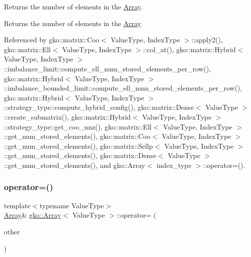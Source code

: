 Returns the number of elements in the \hyperlink{classgko_1_1Array}{Array}. 

\begin{DoxyReturn}{Returns}
the number of elements in the \hyperlink{classgko_1_1Array}{Array} 
\end{DoxyReturn}


Referenced by gko\+::matrix\+::\+Coo$<$ Value\+Type, Index\+Type $>$\+::apply2(), gko\+::matrix\+::\+Ell$<$ Value\+Type, Index\+Type $>$\+::col\+\_\+at(), gko\+::matrix\+::\+Hybrid$<$ Value\+Type, Index\+Type $>$\+::imbalance\+\_\+limit\+::compute\+\_\+ell\+\_\+num\+\_\+stored\+\_\+elements\+\_\+per\+\_\+row(), gko\+::matrix\+::\+Hybrid$<$ Value\+Type, Index\+Type $>$\+::imbalance\+\_\+bounded\+\_\+limit\+::compute\+\_\+ell\+\_\+num\+\_\+stored\+\_\+elements\+\_\+per\+\_\+row(), gko\+::matrix\+::\+Hybrid$<$ Value\+Type, Index\+Type $>$\+::strategy\+\_\+type\+::compute\+\_\+hybrid\+\_\+config(), gko\+::matrix\+::\+Dense$<$ Value\+Type $>$\+::create\+\_\+submatrix(), gko\+::matrix\+::\+Hybrid$<$ Value\+Type, Index\+Type $>$\+::strategy\+\_\+type\+::get\+\_\+coo\+\_\+nnz(), gko\+::matrix\+::\+Ell$<$ Value\+Type, Index\+Type $>$\+::get\+\_\+num\+\_\+stored\+\_\+elements(), gko\+::matrix\+::\+Coo$<$ Value\+Type, Index\+Type $>$\+::get\+\_\+num\+\_\+stored\+\_\+elements(), gko\+::matrix\+::\+Sellp$<$ Value\+Type, Index\+Type $>$\+::get\+\_\+num\+\_\+stored\+\_\+elements(), gko\+::matrix\+::\+Dense$<$ Value\+Type $>$\+::get\+\_\+num\+\_\+stored\+\_\+elements(), and gko\+::\+Array$<$ index\+\_\+type $>$\+::operator=().

\mbox{\label{classgko_1_1Array_a841412d7a03b8210ba39e77b3bd05ce3}} 
\subsubsection{\texorpdfstring{operator=()}{operator=()}\hspace{0.1cm}{\footnotesize\ttfamily [1/2]}}
{\footnotesize\ttfamily template$<$typename Value\+Type$>$ \\
\hyperlink{classgko_1_1Array}{Array}\& \hyperlink{classgko_1_1Array}{gko\+::\+Array}$<$ Value\+Type $>$\+::operator= (\begin{DoxyParamCaption}\item[{const \hyperlink{classgko_1_1Array}{Array}$<$ Value\+Type $>$ \&}]{other }\end{DoxyParamCaption})\hspace{0.3cm}{\ttfamily [inline]}}



